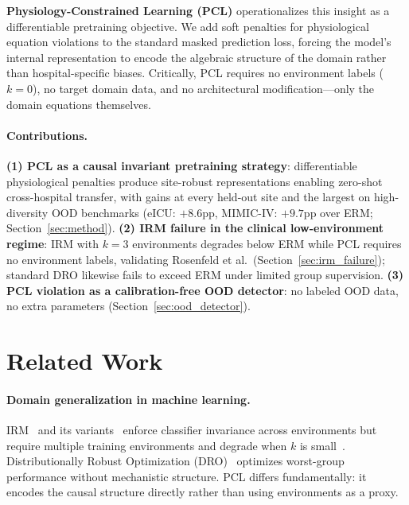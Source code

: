 \documentclass{article}
\begin{document}
\textbf{Physiology-Constrained Learning (PCL)} operationalizes this insight as a differentiable pretraining objective.
We add soft penalties for physiological equation violations to the standard masked prediction loss, forcing the model's internal representation to encode the algebraic structure of the domain rather than hospital-specific biases.
Critically, PCL requires no environment labels ($k = 0$), no target domain data, and no architectural modification---only the domain equations themselves.

\paragraph{Contributions.}
\textbf{(1) PCL as a causal invariant pretraining strategy}: differentiable physiological penalties produce site-robust representations enabling zero-shot cross-hospital transfer, with gains at every held-out site and the largest on high-diversity OOD benchmarks (eICU: $+8.6$pp, MIMIC-IV: $+9.7$pp over ERM; Section~\ref{sec:method}).
\textbf{(2) IRM failure in the clinical low-environment regime}: IRM with $k{=}3$ environments degrades below ERM while PCL requires no environment labels, validating Rosenfeld et al.\ (Section~\ref{sec:irm_failure}); standard DRO likewise fails to exceed ERM under limited group supervision.
\textbf{(3) PCL violation as a calibration-free OOD detector}: no labeled OOD data, no extra parameters (Section~\ref{sec:ood_detector}).

\section{Related Work}
\label{sec:related}

\paragraph{Domain generalization in machine learning.}
IRM~\citep{arjovsky2019invariant} and its variants~\citep{krueger2021out, rame2022fishr} enforce classifier invariance across environments but require multiple training environments and degrade when $k$ is small~\citep{rosenfeld2021risks}.
Distributionally Robust Optimization (DRO)~\citep{sagawa2020distributionally} optimizes worst-group performance without mechanistic structure.
PCL differs fundamentally: it encodes the causal structure directly rather than using environments as a proxy.
\end{document}
